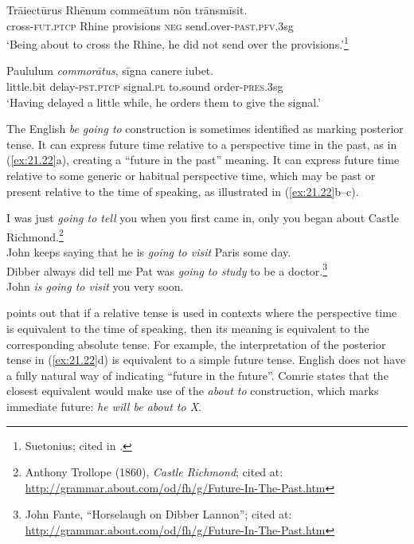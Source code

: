 \ea \label{ex:21.20}
\gll Trāiectūrus  Rhēnum  commeātum  nōn  trānsmīsit.\\
cross-\textsc{fut.ptcp}  Rhine  provisions  \textsc{neg}  send.over-\textsc{past.pfv.3}sg\\
\glt ‘Being about to cross the Rhine, he did not send over the provisions.’\footnote{Suetonius; cited in \citet[61]{Comrie1985}.} \\

\z

\ea \label{ex:21.21}
\gll Paululum  \textit{commorātus},  sīgna  canere  iubet.\\
little.bit  delay-\textsc{pst.ptcp}  signal.\textsc{pl}  to.sound  order-\textsc{pres.3}sg\\
\glt ‘Having delayed a little while, he orders them to give the signal.’\\

\z


The English \textit{be} \textit{going to} construction is sometimes identified as marking posterior tense. It can express future time relative to a perspective time in the past, as in (\ref{ex:21.22}a), creating a “future in the past” meaning. It can express future time relative to some generic or habitual perspective time, which may be past or present relative to the time of speaking, as illustrated in (\ref{ex:21.22}b--c).


\ea \label{ex:21.22}
\ea  I was just \textit{going to tell} you when you first came in, only you began about Castle Richmond.\footnote{Anthony  Trollope (1860), \textit{Castle Richmond}; cited at: \url{http://grammar.about.com/od/fh/g/Future-In-The-Past.htm}} \\
\ex John keeps saying that he is \textit{going to visit} Paris some day.\\
\ex Dibber always did tell me Pat was \textit{going to study} to be a doctor.\footnote{John Fante, “Horselaugh on Dibber Lannon”; cited at: \url{http://grammar.about.com/od/fh/g/Future-In-The-Past.htm}} \\
\ex John \textit{is going to visit} you very soon.
                       \z
\z


\citet{Comrie1985} points out that if a relative tense is used in contexts where the perspective time is equivalent to the time of speaking, then its meaning is equivalent to the corresponding absolute tense. For example, the interpretation of the posterior tense in (\ref{ex:21.22}d) is equivalent to a simple future tense. English does not have a fully natural way of indicating “future in the future”. Comrie states that the closest equivalent would make use of the \textit{about to} construction, which marks immediate future: \textit{he will be about to X}. 


